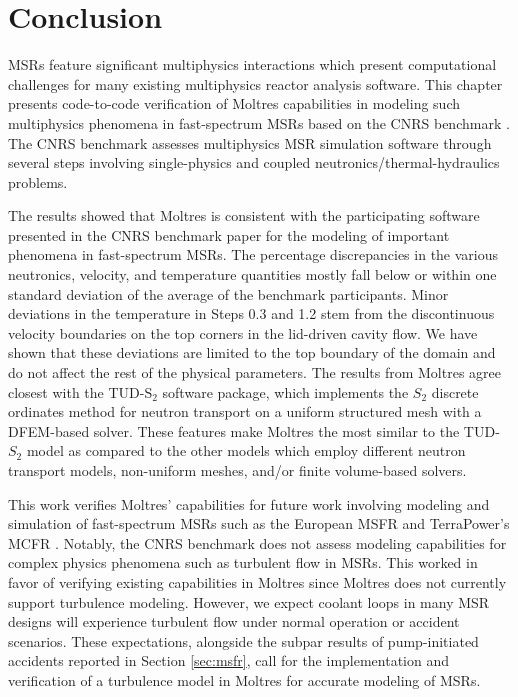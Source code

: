 \section{Conclusion}

\glspl{MSR} feature significant multiphysics interactions which present
computational challenges for many existing multiphysics reactor analysis
software. This chapter presents code-to-code verification of Moltres
capabilities in modeling such multiphysics phenomena in fast-spectrum
\glspl{MSR} based on the CNRS benchmark \cite{tiberga_results_2020}.
The CNRS benchmark assesses multiphysics \gls{MSR} simulation
software through several steps involving single-physics and coupled
neutronics/thermal-hydraulics problems.

The results showed that Moltres is consistent with the participating software
presented in the CNRS benchmark paper for the modeling of important phenomena
in fast-spectrum \glspl{MSR}. The percentage discrepancies in the various
neutronics, velocity, and temperature quantities mostly fall below or within
one standard deviation of the average of the benchmark participants.
Minor deviations in the temperature in Steps 0.3 and 1.2 
stem from the discontinuous velocity
boundaries on the top corners in the lid-driven cavity flow. We have shown that
these deviations are limited to the top boundary of the domain and do not
affect the rest of the physical parameters. The results from
Moltres agree closest with the TUD-S$_2$ software package, which implements the
$S_2$ discrete ordinates method for
neutron transport on a uniform structured mesh with a \gls{DFEM}-based solver.
These features make Moltres the most similar to the TUD-$S_2$ model as compared
to the other models which employ different neutron transport models,
non-uniform meshes, and/or finite volume-based solvers.

This work verifies Moltres' capabilities for future work involving modeling and
simulation of fast-spectrum \glspl{MSR} such as the European \gls{MSFR} and
TerraPower's \gls{MCFR} \cite{terrapower_terrapower_2021}. Notably, the CNRS
benchmark does not assess modeling capabilities for complex physics phenomena
such as turbulent flow in \glspl{MSR}. This worked in favor of verifying
existing capabilities in Moltres since Moltres does not currently support
turbulence modeling. However, we expect coolant loops in many \gls{MSR} designs
will experience turbulent flow under normal operation or accident scenarios.
These expectations, alongside the subpar results of pump-initiated accidents
reported in Section \ref{sec:msfr}, call for the implementation and
verification of a turbulence model in Moltres for accurate modeling of
\glspl{MSR}.

\FloatBarrier
